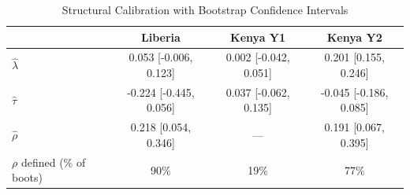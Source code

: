 \begin{table}[htbp]
\centering\small
\caption{Structural Calibration with Bootstrap Confidence Intervals}
\label{tab:calib_boot}
\begin{tabular}{lccc}
\toprule
 & Liberia & Kenya Y1 & Kenya Y2 \\
\midrule
$\hat{\lambda}$ & 0.053 [-0.006, 0.123] & 0.002 [-0.042, 0.051] & 0.201 [0.155, 0.246] \\
$\hat{\tau}$ & -0.224 [-0.445, 0.056] & 0.037 [-0.062, 0.135] & -0.045 [-0.186, 0.085] \\
$\hat{\rho}$ & 0.218 [0.054, 0.346] & --- & 0.191 [0.067, 0.395] \\
$\rho$ defined (\% of boots) & 90\% & 19\% & 77\% \\
\bottomrule
\end{tabular}
\par\smallskip{}
\end{table}